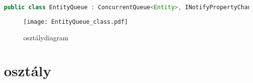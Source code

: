 \begin{mdframed}[backgroundcolor=gray!20]
\begin{small}
\begin{scriptsize}
\begin{lstlisting}[language=java]
public class EntityQueue : ConcurrentQueue<Entity>, INotifyPropertyChanged
\end{lstlisting}
\end{scriptsize}
\end{small}
\end{mdframed}

\begin{figure}[h]
\texttt{[image: EntityQueue\_class.pdf]}
\centering
\caption{ osztálydiagram}
\label{fig:entity_queue_class_diagram}
\end{figure}

\section{ osztály}

